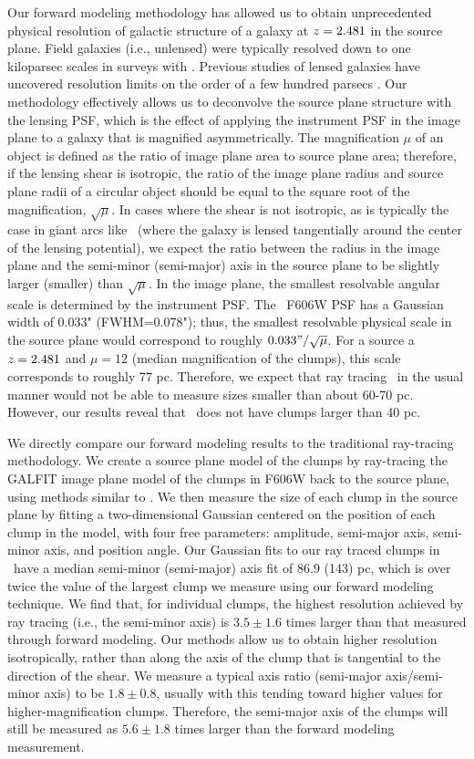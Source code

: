 Our forward modeling methodology has allowed us to obtain unprecedented physical resolution of galactic structure of a galaxy at $z=2.481$ in the source plane. Field galaxies (i.e., unlensed) were typically resolved down to one kiloparsec scales in surveys with \hst. Previous studies of lensed galaxies have uncovered resolution limits on the order of a few hundred parsecs \citep{Jones:2010uq,Livermore:2012fk,Swinbank:2012jk,Wisnioski:2012qf,Livermore:2015ve}. Our methodology effectively allows us to deconvolve the source plane structure with the lensing PSF, which is the effect of applying the instrument PSF in the image plane to a galaxy that is magnified asymmetrically. The magnification $\mu$ of an object is defined as the ratio of image plane area to source plane area; therefore, if the lensing shear is isotropic, the ratio of the image plane radius and source plane radii of a circular object should be equal to the square root of the magnification, $\sqrt\mu$. In cases where the shear is not isotropic, as is typically the case in giant arcs like \giantarc\ (where the galaxy is lensed tangentially around the center of the lensing potential), we expect the ratio between the radius in the image plane and the semi-minor (semi-major) axis in the source plane to be slightly larger (smaller) than $\sqrt\mu$. In the image plane, the smallest resolvable angular scale is determined by the instrument PSF. The \hst\ F606W PSF has a Gaussian width of 0.033" (FWHM=0.078"); thus, the smallest resolvable physical scale in the source plane would correspond to roughly $0.033"/\sqrt\mu$. For a source a $z=2.481$ and $\mu=12$ (median magnification of the clumps), this scale corresponds to roughly 77 pc. Therefore, we expect that ray tracing \giantarc\ in the usual manner would not be able to measure sizes smaller than about 60-70 pc. However, our results reveal that \giantarc\ does not have clumps larger than 40 pc. 

We directly compare our forward modeling results to the traditional ray-tracing methodology. We create a source plane model of the clumps by ray-tracing the GALFIT image plane model of the clumps in F606W back to the source plane, using methods similar to \citet{Sharon:2012ly}. We then measure the size of each clump in the source plane by fitting a two-dimensional Gaussian centered on the position of each clump in the model, with four free parameters: amplitude, semi-major axis, semi-minor axis, and position angle. Our Gaussian fits to our ray traced clumps in \giantarc\ have a median semi-minor (semi-major) axis fit of 86.9 (143) pc, which is over twice the value of the largest clump we measure using our forward modeling technique. We find that, for individual clumps, the highest resolution achieved by ray tracing (i.e., the semi-minor axis) is $3.5\pm1.6$ times larger than that measured through forward modeling. Our methods allow us to obtain higher resolution isotropically, rather than along the axis of the clump that is tangential to the direction of the shear. We measure a typical axis ratio (semi-major axis/semi-minor axis) to be $1.8\pm0.8$, usually with this tending toward higher values for higher-magnification clumps. Therefore, the semi-major axis of the clumps will still be measured as $5.6\pm1.8$ times larger than the forward modeling measurement.

